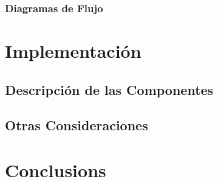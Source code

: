 \documentclass[12pt]{article}
\begin{document}
\subsubsection{Diagramas de Flujo}

\newpage
\section{Implementación}
\subsection{Descripción de las Componentes}
\subsection{Otras Consideraciones}

\section{Conclusions}\label{conclusions}


\newpage

%
\end{document}
